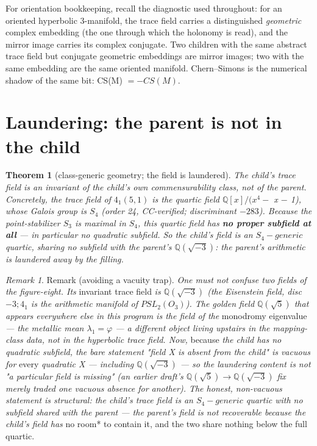 \documentclass[11pt]{article}
\theoremstyle{plain}
\newtheorem{theorem}{Theorem}[section]
\theoremstyle{definition}
\theoremstyle{remark}
\newtheorem*{remark}{Remark}
\begin{document}
For orientation bookkeeping, recall the diagnostic used throughout: for an oriented hyperbolic 3-manifold, the trace field carries a distinguished \emph{geometric} complex embedding (the one through which the holonomy is read), and the mirror image carries its complex conjugate. Two children with the same abstract trace field but conjugate geometric embeddings are mirror images; two with the same embedding are the same oriented manifold. Chern–Simons is the numerical shadow of the same bit: CS(M) \(= -CS(M)\).

\section{Laundering: the parent is not in the child}

\begin{theorem}[class-generic geometry; the field is laundered]
The child's trace field is an invariant of the child's own commensurability class, not of the parent. Concretely, the trace field of \(4_{1}(5,1)\) is the quartic field \(\mathbb{Q}[x]/(x^{4} -\) x \(-\) 1), whose Galois group is \textbf{\(S_{4}\)} (order 24, CC-verified; discriminant \(-283\)). Because the point-stabilizer \(S_{3}\) is maximal in \(S_{4}\), this quartic field has \textbf{no proper subfield at all} — in particular no quadratic subfield. So the child's field is an \(S_{4}-generic\) quartic, sharing \emph{no} subfield with the parent's \(\mathbb{Q}(\sqrt{-3})\): the parent's arithmetic is laundered away by the filling.
\end{theorem}

\begin{remark}Remark (avoiding a vacuity trap).\emph{ One must not confuse two fields of the figure-eight. Its }invariant trace field\emph{ is \(\mathbb{Q}(\sqrt{-3})\) (the Eisenstein field, disc \(-3; 4_{1}\) is the arithmetic manifold of \(PSL_{2}(O_{3})\)). The golden field \(\mathbb{Q}(\sqrt{5})\) that appears everywhere else in this program is the field of the }monodromy eigenvalue\emph{ — the metallic mean \(\lambda _{1} = \varphi \) — a different object living upstairs in the mapping-class data, not in the hyperbolic trace field. Now, }because\emph{ the child has no quadratic subfield, the bare statement "field X is absent from the child" is vacuous for }every\emph{ quadratic X — including \(\mathbb{Q}(\sqrt{-3})\) — so the laundering content is not "a particular field is missing" (an earlier draft's \(\mathbb{Q}(\sqrt{5})\to \mathbb{Q}(\sqrt{-3})\) fix merely traded one vacuous absence for another). The honest, non-vacuous statement is structural: the child's trace field is an \(S_{4}-generic\) quartic with no subfield shared with the parent — the parent's field is not recoverable because the child's field has }no room* to contain it, and the two share nothing below the full quartic.\end{remark}
\end{document}
